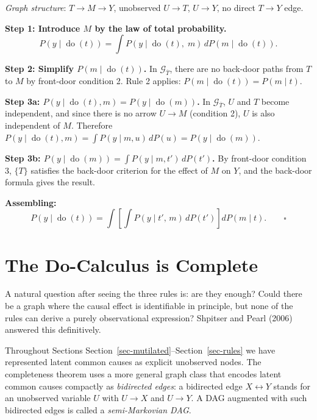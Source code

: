 \documentclass[
  a4paper,
]{book}
\newcounter{none} %
\newcommand{\doop}{\operatorname{do}}
\newcommand{\Gcal}{\mathcal{G}}
\begin{document}
\begin{tcolorbox}[enhanced jigsaw, arc=.35mm, bottomrule=.15mm, bottomtitle=1mm, breakable, colback=white, colbacktitle=quarto-callout-note-color!10!white, colframe=quarto-callout-note-color-frame, coltitle=black, left=2mm, leftrule=.75mm, opacityback=0, opacitybacktitle=0.6, rightrule=.15mm, title={Proof of the Front-Door Formula (Theorem 3.2)}, titlerule=0mm, toprule=.15mm, toptitle=1mm]

\emph{Graph structure}: \(T \to M \to Y\), unobserved \(U \to T\),
\(U \to Y\), no direct \(T \to Y\) edge.

\textbf{Step 1: Introduce \(M\) by the law of total probability.}
\[P(y \mid \doop(t)) = \int P(y \mid \doop(t),\;m)\,dP(m \mid \doop(t)).\]

\textbf{Step 2: Simplify \(P(m \mid \doop(t))\).} In
\(\Gcal_{\overline{T}}\), there are no back-door paths from \(T\) to
\(M\) by front-door condition 2. Rule 2 applies:
\(P(m \mid \doop(t)) = P(m \mid t)\).

\textbf{Step 3a: \(P(y \mid \doop(t), m) = P(y \mid \doop(m))\).} In
\(\Gcal_{\overline{T}}\), \(U\) and \(T\) become independent, and since
there is no arrow \(U \to M\) (condition 2), \(U\) is also independent
of \(M\). Therefore
\(P(y \mid \doop(t), m) = \int P(y \mid m, u)\,dP(u) = P(y \mid \doop(m))\).

\textbf{Step 3b: \(P(y \mid \doop(m)) = \int P(y \mid m, t')\,dP(t')\).}
By front-door condition 3, \(\{T\}\) satisfies the back-door criterion
for the effect of \(M\) on \(Y\), and the back-door formula gives the
result.

\textbf{Assembling:}
\[P(y \mid \doop(t)) = \int\!\left[\int P(y \mid t',\,m)\,dP(t')\right]dP(m \mid t). \qquad \square\]

\end{tcolorbox}

\section{The Do-Calculus is Complete}\label{sec-completeness}

A natural question after seeing the three rules is: are they enough?
Could there be a graph where the causal effect is identifiable in
principle, but none of the rules can derive a purely observational
expression? Shpitser and Pearl (2006) answered this definitively.

Throughout Sections Section~\ref{sec-mutilated}--Section~\ref{sec-rules}
we have represented latent common causes as explicit unobserved nodes.
The completeness theorem uses a more general graph class that encodes
latent common causes compactly as \emph{bidirected edges}: a bidirected
edge \(X \leftrightarrow Y\) stands for an unobserved variable \(U\)
with \(U \to X\) and \(U \to Y\). A DAG augmented with such bidirected
edges is called a \emph{semi-Markovian DAG}.
\end{document}
